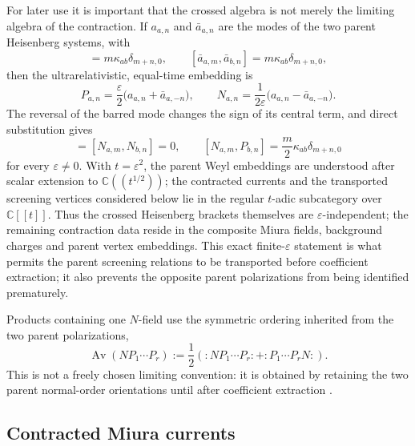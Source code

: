 \documentclass[11pt,a4paper]{article}
\numberwithin{equation}{section}
\theoremstyle{remark}
\newcommand{\Av}[1]{\operatorname{Av}\!\left(#1\right)}
\newcommand{\eps}{\varepsilon}
\begin{document}
For later use it is important that the crossed algebra is not merely the limiting algebra of
the contraction.  If $a_{a,n}$ and $\bar a_{a,n}$ are the modes of the two parent Heisenberg
systems, with
\begin{equation}
 [a_{a,m},a_{b,n}]=m\kappa_{ab}\delta_{m+n,0},\qquad
 [\bar a_{a,m},\bar a_{b,n}]=m\kappa_{ab}\delta_{m+n,0},
 \label{eq:parent-heisenberg}
\end{equation}
then the ultrarelativistic, equal-time embedding is
\begin{equation}
 P_{a,n}=\frac{\eps}{2}\bigl(a_{a,n}+\bar a_{a,-n}\bigr),\qquad
 N_{a,n}=\frac{1}{2\eps}\bigl(a_{a,n}-\bar a_{a,-n}\bigr).
 \label{eq:mode-contraction}
\end{equation}
The reversal of the barred mode changes the sign of its central term, and direct substitution
gives
\begin{equation}
 [P_{a,m},P_{b,n}]=[N_{a,m},N_{b,n}]=0,\qquad
 [N_{a,m},P_{b,n}]=\frac m2\kappa_{ab}\delta_{m+n,0}
 \label{eq:finite-eps-crossed}
\end{equation}
for every $\eps\ne0$.  With $t=\eps^2$, the parent Weyl embeddings are
understood after scalar extension to $\mathbb C((t^{1/2}))$; the contracted currents and the
transported screening vertices considered below lie in the regular $t$-adic subcategory over
$\mathbb C[[t]]$.  Thus the crossed Heisenberg brackets themselves are $\eps$-independent;
the remaining contraction data reside in the composite Miura fields, background charges and
parent vertex embeddings.  This exact finite-$\eps$ statement is what permits the
parent screening relations to be transported before coefficient extraction; it also prevents
the opposite parent polarizations from being identified prematurely.

Products containing one $N$-field use the symmetric ordering inherited from the two parent
polarizations,
\begin{equation}
 \Av{N P_1\cdots P_r}
 :=\frac12\left(:N P_1\cdots P_r:+:P_1\cdots P_r N:\right).
 \label{eq:averaged-order}
\end{equation}
This is not a freely chosen limiting convention: it is obtained by retaining the two parent
normal-order orientations until after coefficient extraction \cite{FredenhagenHoerl}.

\subsection{Contracted Miura currents}
\end{document}
